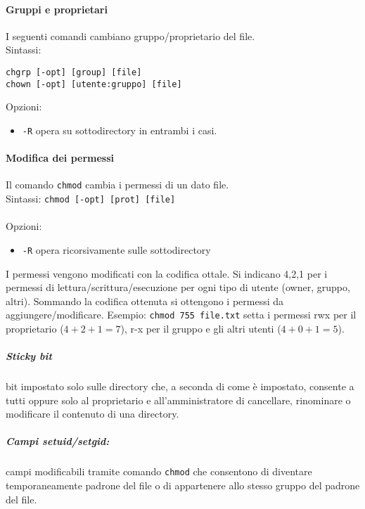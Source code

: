 \documentclass[a4paper]{article}
\begin{document}
\paragraph{Gruppi e proprietari} I seguenti comandi cambiano gruppo/proprietario del file.\\
Sintassi:
\begin{verbatim}
chgrp [-opt] [group] [file]
chown [-opt] [utente:gruppo] [file]
\end{verbatim}
Opzioni:
\begin{itemize}
\item \verb|-R| opera su sottodirectory in entrambi i casi.
\end{itemize}

\paragraph{Modifica dei permessi} Il comando \verb|chmod| cambia i permessi di un dato file.\\
Sintassi:
\verb|chmod [-opt] [prot] [file]| \\ \\
Opzioni:
\begin{itemize}
\item \verb|-R| opera ricorsivamente sulle sottodirectory
\end{itemize}
I permessi vengono modificati con la codifica ottale. Si indicano 4,2,1 per i permessi di lettura/scrittura/esecuzione per ogni tipo di utente (owner, gruppo, altri).
Sommando la codifica ottenuta si ottengono i permessi da aggiungere/modificare.
Esempio: \verb|chmod 755 file.txt| setta i permessi rwx per il proprietario ($4+2+1=7$), r-x per il gruppo e gli altri utenti ($4+0+1=5$).

\subparagraph{Sticky bit} bit impostato solo sulle directory che, a seconda di come è impostato, consente a tutti oppure solo al proprietario e all'amministratore di cancellare, rinominare o modificare il contenuto di una directory.

\subparagraph{Campi setuid/setgid:} campi modificabili tramite comando \verb|chmod| che consentono di diventare temporaneamente padrone del file o di appartenere allo stesso gruppo del padrone del file.
\end{document}
